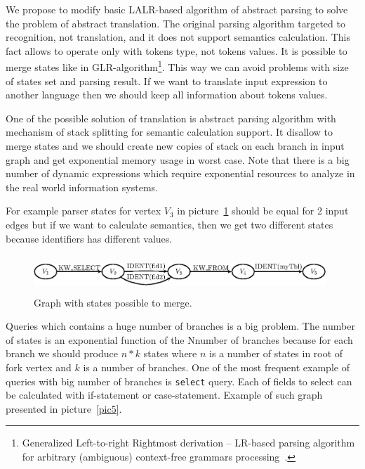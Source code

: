 \documentclass{llncs}
\begin{document}
We propose to modify basic LALR-based algorithm of abstract parsing to solve the problem of abstract translation. The original parsing algorithm targeted to recognition, not translation, and it does not support semantics calculation. This fact allows to operate only with tokens type, not tokens values. It is possible to merge states like in GLR-algorithm\footnote{Generalized Left-to-right Rightmost derivation -- LR-based parsing algorithm for arbitrary (ambiguous) context-free grammars processing~\cite{Grune}.}. This way we can avoid problems with size of states set and parsing result. If we want to translate input expression to another language then we should keep all information about tokens values. 

One of the possible solution of translation is abstract parsing algorithm with mechanism of stack splitting for semantic calculation support. It disallow to merge states and we should create new copies of stack on each branch in input graph and get exponential memory usage in worst case. Note that there is a big number of dynamic expressions which require exponential resources to analyze in the real world information systems. 

For example parser states for vertex $V_3$ in picture~\ref{pic4} should be equal for 2 input edges but if we want to calculate semantics, then we get two different states because identifiers has different values.

\begin{figure}
    \begin{center}
        \includegraphics[width=11cm,height=1.4cm]{graphs/states_example.eps}
        \caption{Graph with states possible to merge.}
        \label{pic4}
    \end{center}
\end{figure}

Queries which contains a huge number of branches is a big problem. The number of states is an exponential function of the Nnumber of branches because for each branch we should produce $n*k$ states where $n$ is a number of states in root of fork vertex and $k$ is a number of branches. One of the most frequent example of queries with big number of branches is \verb|select| query. Each of fields to select can be calculated with if-statement or case-statement. Example of such graph presented in picture~\ref{pic5}.
\end{document}
